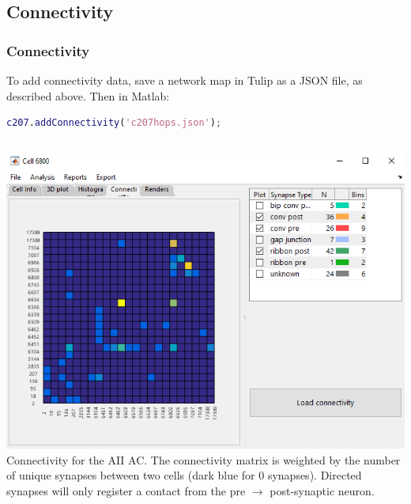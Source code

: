 \documentclass[11pt]{beamer}
\begin{document}
\subsection{Connectivity}
\begin{frame}[fragile]
	\frametitle{Connectivity}
	To add connectivity data, save a network map in Tulip as a JSON file, as described above. Then in Matlab:
	\begin{lstlisting}[language=matlab]
c207.addConnectivity('c207hops.json');\end{lstlisting}
	\vskip10pt
	\begin{columns}
		\includegraphics[height=0.4\textheight]{c6800_network}	
		\vskip10pt
		Connectivity for the AII AC.
		The connectivity matrix is weighted by the number of unique synapses between two cells (dark blue for 0 synapses). Directed synapses will only register a contact from the pre $\rightarrow$ post-synaptic neuron.
	\end{columns}

\end{frame}
\end{document}
